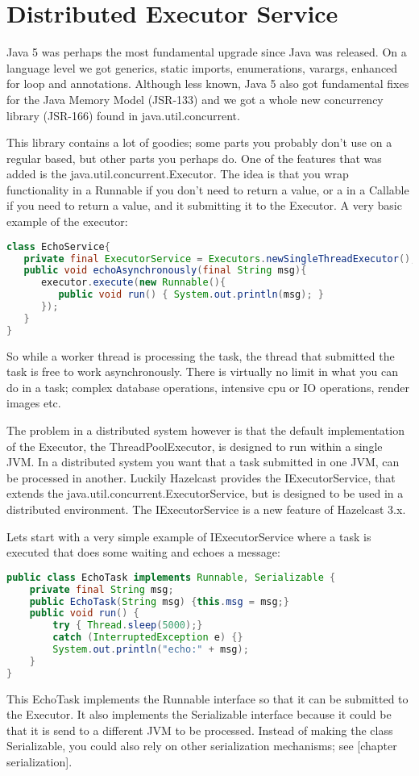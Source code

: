 \chapter{Distributed Executor Service}
Java 5 was perhaps the most fundamental upgrade since Java was released. On a language level we got generics, static imports, enumerations, varargs, enhanced for loop and annotations. Although less known, Java 5 also got fundamental fixes for the Java Memory Model (JSR-133) and we got a whole new concurrency library (JSR-166) found in java.util.concurrent.

This library contains a lot of goodies; some parts you probably don't use on a regular based, but other parts you perhaps do. One of the features that was added is the java.util.concurrent.Executor. The idea is that you wrap functionality in a Runnable if you don't need to return a value, or a in a Callable if you need to return a value, and it submitting it to the Executor. A very basic example of the executor:
\begin{lstlisting}[language=java]
class EchoService{
   private final ExecutorService = Executors.newSingleThreadExecutor();
   public void echoAsynchronously(final String msg){
      executor.execute(new Runnable(){
         public void run() { System.out.println(msg); }
      });	
   }
}
\end{lstlisting}
So while a worker thread is processing the task, the thread that submitted the task is free to work asynchronously. There is virtually no limit in what you can do in a task; complex database operations, intensive cpu or IO operations, render images etc. 

The problem in a distributed system however is that the default implementation of the Executor, the ThreadPoolExecutor, is designed to run within a single JVM. In a distributed system you want that a task submitted in one JVM, can be processed in another. Luckily Hazelcast provides the IExecutorService, that extends the java.util.concurrent.ExecutorService, but is designed to be used in a distributed environment. The IExecutorService is a new feature of Hazelcast 3.x.

Lets start with a very simple example of IExecutorService where a task is executed that does some waiting and echoes a message:
\begin{lstlisting}[language=java]
public class EchoTask implements Runnable, Serializable {
    private final String msg;
    public EchoTask(String msg) {this.msg = msg;}
    public void run() {
        try { Thread.sleep(5000);} 
        catch (InterruptedException e) {}
        System.out.println("echo:" + msg);
    }
}
\end{lstlisting}
This EchoTask implements the Runnable interface so that it can be submitted to the Executor. It also implements the Serializable interface because it could be that it is send to a different JVM to be processed. Instead of making the class Serializable, you could also rely on other serialization mechanisms; see [chapter serialization]. 

